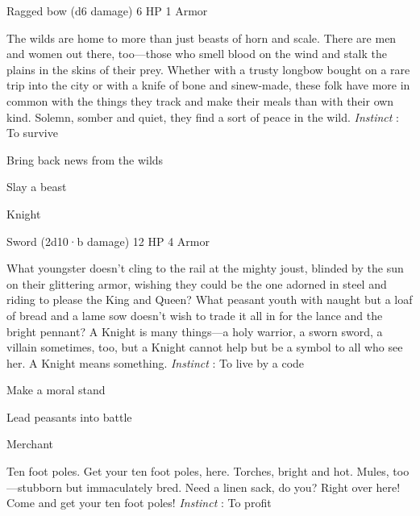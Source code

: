 Ragged bow (d6 damage)	6 HP	1 Armor

 


 
\startMonsterDescription
The wilds are home to more than just beasts of horn and scale. There are men and women out there, too—those who smell blood on the wind and stalk the plains in the skins of their prey. Whether with a trusty longbow bought on a rare trip into the city or with a knife of bone and sinew-made, these folk have more in common with the things they track and make their meals than with their own kind. Solemn, somber and quiet, they find a sort of peace in the wild. {\em Instinct} : To survive
\stopMonsterDescription
 
\startitemize[1,packed]

\item Bring back news from the wilds

 
\item Slay a beast


\stopitemize
 
\startMonsterName
Knight	 
\stopMonsterName
 

Sword (2d10·b damage)	12 HP	4 Armor

 


 
\startMonsterDescription
What youngster doesn’t cling to the rail at the mighty joust, blinded by the sun on their glittering armor, wishing they could be the one adorned in steel and riding to please the King and Queen? What peasant youth with naught but a loaf of bread and a lame sow doesn’t wish to trade it all in for the lance and the bright pennant? A Knight is many things—a holy warrior, a sworn sword, a villain sometimes, too, but a Knight cannot help but be a symbol to all who see her. A Knight means something. {\em Instinct} : To live by a code
\stopMonsterDescription
 
\startitemize[1,packed]

\item Make a moral stand

 
\item Lead peasants into battle


\stopitemize
 
\startMonsterName
Merchant	
\stopMonsterName
 
\startMonsterDescription
Ten foot poles. Get your ten foot poles, here. Torches, bright and hot. Mules, too—stubborn but immaculately bred. Need a linen sack, do you? Right over here! Come and get your ten foot poles! {\em Instinct} : To profit
\stopMonsterDescription
 
